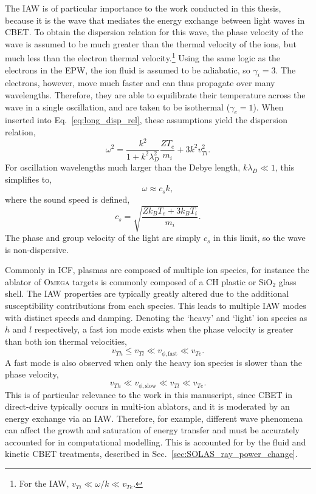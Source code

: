 The \ac{IAW} is of particular importance to the work conducted in this thesis, because it is the wave that mediates the energy exchange between light waves in \ac{CBET}.
To obtain the dispersion relation for this wave, the phase velocity of the wave is assumed to be much greater than the thermal velocity of the ions, but much less than the electron thermal velocity.\footnote{For the \ac{IAW}, $v_{Ti}\ll \omega/k \ll v_{Te}$.}
Using the same logic as the electrons in the \ac{EPW}, the ion fluid is assumed to be adiabatic, so $\gamma_i=3$.
The electrons, however, move much faster and can thus propagate over many wavelengths.
Therefore, they are able to equilibrate their temperature across the wave in a single oscillation, and are taken to be isothermal ($\gamma_e=1$).
When inserted into Eq.~\ref{eq:long_disp_rel}, these assumptions yield the dispersion relation,
\begin{equation}
    \omega^2 = \frac{k^2}{1 + k^2\lambda_D^2}\frac{ZT_e}{m_i} + 3 k^2 v_{Ti}^2.
\end{equation}
For oscillation wavelengths much larger than the Debye length, $k \lambda_D \ll 1$, this simplifies to,
\begin{equation}
    \omega \approx c_s k,
\end{equation}
where the sound speed is defined,
\begin{equation}
    c_s = \sqrt{\frac{Z k_B T_e + 3 k_B T_i}{m_i}}.
\end{equation}
The phase and group velocity of the light are simply $c_s$ in this limit, so the wave is non-dispersive.

Commonly in \ac{ICF}, plasmas are composed of multiple ion species, for instance the ablator of \textsc{Omega} targets is commonly composed of a CH plastic or SiO$_2$ glass shell.
The \ac{IAW} properties are typically greatly altered due to the additional susceptibility contributions from each species.
This leads to multiple \ac{IAW} modes with distinct speeds and damping.
Denoting the `heavy' and `light' ion species as $h$ and $l$ respectively, a fast ion mode exists when the phase velocity is greater than both ion thermal velocities,
\begin{equation}
    v_{Th} \leq v_{Tl} \ll v_{\phi,\text{fast}} \ll v_{Te}.
\end{equation}
A fast mode is also observed when only the heavy ion species is slower than the phase velocity,
\begin{equation}
    v_{Th} \ll v_{\phi,\text{slow}} \ll v_{Tl}  \ll v_{Te}.
\end{equation}
This is of particular relevance to the work in this manuscript, since \ac{CBET} in direct-drive typically occurs in multi-ion ablators, and it is moderated by an energy exchange via an \ac{IAW}.
Therefore, for example, different wave phenomena can affect the growth and saturation of energy transfer and must be accurately accounted for in computational modelling.
This is accounted for by the fluid and kinetic \ac{CBET} treatments, described in Sec.~\ref{sec:SOLAS_ray_power_change}.

